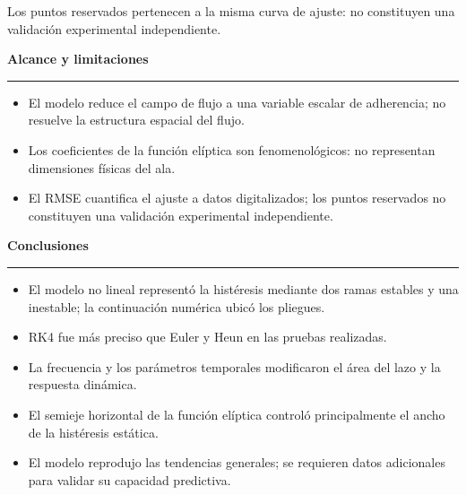 \documentclass[final]{article}
\newcommand{\headingfont}{\sffamily}
\newcommand{\cuerpoSmall}{\fontsize{19}{24}\selectfont}
\newcommand{\bloque}[1]{%
  \par\vspace{0.10cm}%
  \begin{center}
    {\headingfont\bfseries\color{utecNavy}\fontsize{29}{34}\selectfont #1}
  \end{center}%
  \vspace{-0.44cm}%
  {\color{utecNavy}\rule{\linewidth}{1.1pt}}\par
  \vspace{0.34cm}%
}
\begin{document}
\begin{minipage}[t]{37.44cm}
{\cuerpoSmall\color{utecGray}
Los puntos reservados pertenecen a la misma curva de ajuste: no constituyen
una validación experimental independiente.}

\bloque{Alcance y limitaciones}
{\cuerpoSmall
\begin{itemize}[leftmargin=0.80cm, itemsep=0.12cm, topsep=0.05cm,
                  label=\textcolor{utecCyan}{\textbullet}]
  \item El modelo reduce el campo de flujo a una variable escalar de
        adherencia; no resuelve la estructura espacial del flujo.
  \item Los coeficientes de la función elíptica son fenomenológicos: no
        representan dimensiones físicas del ala.
  \item El RMSE cuantifica el ajuste a datos digitalizados; los puntos
        reservados no constituyen una validación experimental independiente.
\end{itemize}
}

\bloque{Conclusiones}
\begin{itemize}[leftmargin=0.78cm, itemsep=0.10cm, topsep=0.05cm,
                  label=\textcolor{utecCyan}{\textbullet}]
  \item El modelo no lineal representó la histéresis mediante dos ramas
        estables y una inestable; la continuación numérica ubicó los pliegues.
  \item RK4 fue más preciso que Euler y Heun en las pruebas realizadas.
  \item La frecuencia y los parámetros temporales modificaron el área del
        lazo y la respuesta dinámica.
  \item El semieje horizontal de la función elíptica controló principalmente
        el ancho de la histéresis estática.
  \item El modelo reprodujo las tendencias generales; se requieren datos
        adicionales para validar su capacidad predictiva.
\end{itemize}


\end{minipage}
\end{document}
